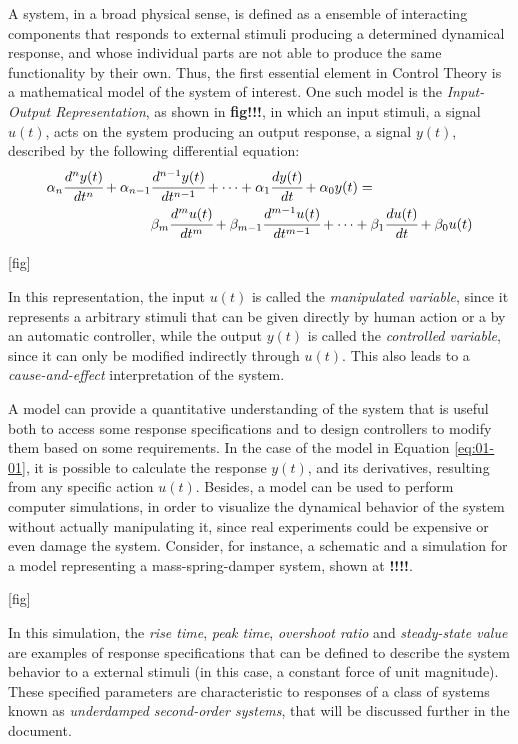 \documentclass[a4paper,11pt]{book}
\numberwithin{figure}{chapter}
\numberwithin{equation}{chapter}
\numberwithin{table}{chapter}
\theoremstyle{definition}
\begin{document}
A system, in a broad physical sense, is defined as a ensemble of interacting components that responds to external stimuli producing a determined dynamical response, and whose individual parts are not able to produce the same functionality by their own. Thus, the first essential element in Control Theory is a mathematical model of the system of interest. One such model is the \textit{Input-Output Representation}, as shown in \textbf{fig!!!}, in which an input stimuli, a signal $u(t)$, acts on the system producing an output response, a signal $y(t)$, described by the following differential equation:
\begin{equation} \label{eq:01-01}
\begin{split}
    \alpha_n \cfrac{d^n y(t)}{dt^n} + \alpha_{n-1} & \cfrac{d^{n-1} y(t)}{dt^{n-1}} + \cdots + \alpha_{1} \cfrac{d y(t)}{dt} + \alpha_{0} y(t) = \\
    & \beta_m \cfrac{d^m u(t)}{dt^m} + \beta_{m-1} \cfrac{d^{m-1} u(t)}{dt^{m-1}} + \cdots + \beta_{1} \cfrac{d u(t)}{dt} + \beta_{0} u(t)
\end{split}
\end{equation}

[fig]

In this representation, the input $u(t)$ is called the \textit{manipulated variable}, since it represents a arbitrary stimuli that can be given directly by human action or a by an automatic controller, while the output $y(t)$ is called the \textit{controlled variable}, since it can only be modified indirectly through $u(t)$. This also leads to a \textit{cause-and-effect} interpretation of the system.

A model can provide a quantitative understanding of the system that is useful both to access some response specifications and to design controllers to modify them based on some requirements. In the case of the model in Equation \eqref{eq:01-01}, it is possible to calculate the response $y(t)$, and its derivatives, resulting from any specific action $u(t)$. Besides, a model can be used to perform computer simulations, in order to visualize the dynamical behavior of the system without actually manipulating it, since real experiments could be expensive or even damage the system. Consider, for instance, a schematic and a simulation for a model representing a mass-spring-damper system, shown at \textbf{!!!!}.

[fig]

In this simulation, the \textit{rise time}, \textit{peak time}, \textit{overshoot ratio} and \textit{steady-state value} are examples of response specifications that can be defined to describe the system behavior to a external stimuli (in this case, a constant force of unit magnitude). These specified parameters are characteristic to responses of a class of systems known as \textit{underdamped second-order systems}, that will be discussed further in the document. 
\end{document}
